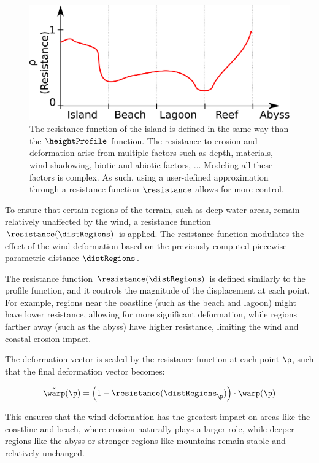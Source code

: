 \begin{figure}[H]
	\centering
	\includegraphics[width=0.45 \linewidth]{resistanceFunction.pdf}
    \caption{The resistance function of the island is defined in the same way than the $\heightProfile$ function. The resistance to erosion and deformation arise from multiple factors such as depth, materials, wind shadowing, biotic and abiotic factors, ... Modeling all these factors is complex. As such, using a user-defined approximation through a resistance function $\resistance$ allows for more control. }
    \label{fig:coral-island_resistance-function}
\end{figure}

To ensure that certain regions of the terrain, such as deep-water areas, remain relatively unaffected by the wind, a resistance function $\resistance(\distRegions)$ is applied. The resistance function modulates the effect of the wind deformation based on the previously computed piecewise parametric distance $\distRegions$.

The resistance function $\resistance(\distRegions)$ is defined similarly to the profile function, and it controls the magnitude of the displacement at each point. For example, regions near the coastline (such as the beach and lagoon) might have lower resistance, allowing for more significant deformation, while regions farther away (such as the abyss) have higher resistance, limiting the wind and coastal erosion impact.

The deformation vector is scaled by the resistance function at each point $\p$, such that the final deformation vector becomes:

\begin{align}
    \Tilde{\warp}(\p) = \left(1 - \resistance(\distRegions_\p) \right) \cdot \warp(\p)
\end{align}

This ensures that the wind deformation has the greatest impact on areas like the coastline and beach, where erosion naturally plays a larger role, while deeper regions like the abyss or stronger regions like mountains remain stable and relatively unchanged.

